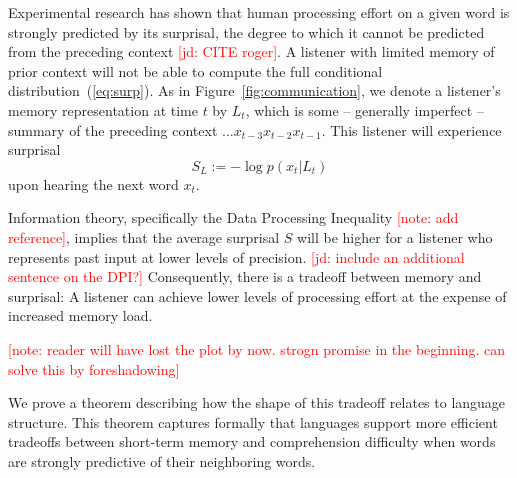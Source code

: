 \documentclass[12pt]{article}
\newcounter{theorem}
\newcommand{\jd}[1]{\textcolor{Red}{[jd: #1]}}
\newcommand{\note}[1]{\textcolor{Red}{[note: #1]}}
\begin{document}
Experimental research has shown that human processing effort on a given word is strongly predicted by its surprisal, the degree to which it cannot be predicted from the preceding context \jd{CITE roger}.
A listener with limited memory of prior context will not be able to compute the full conditional distribution~(\ref{eq:surp}).
As in Figure~\ref{fig:communication}, we denote a listener's memory representation at time $t$ by $L_t$, which is some -- generally imperfect -- summary of the preceding context $\dots x_{t-3}x_{t-2}x_{t-1}$.
This listener will experience surprisal
\begin{equation}\label{eq:surp-listener}
	S_L :=	-\log p(x_t|L_t)
\end{equation}
upon hearing the next word $x_t$.


Information theory, specifically the Data Processing Inequality \note{add reference}, implies that the average surprisal $S$ will be higher for a listener who represents past input at lower levels of precision. \jd{include an additional sentence on the DPI?}
Consequently, there is a tradeoff between memory and surprisal:
A listener can achieve lower levels of processing effort at the expense of increased memory load.

\note{reader will have lost the plot by now. strogn promise in the beginning. can solve this by foreshadowing}




We prove a theorem describing how the shape of this tradeoff relates to language structure. %
This theorem captures formally that languages support more efficient tradeoffs between short-term memory and comprehension difficulty when words are strongly predictive of their neighboring words.
\end{document}
